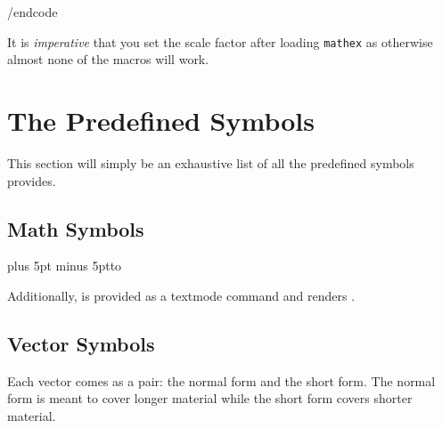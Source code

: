 \begincode

/endcode\par

It is {\it imperative} that you set the scale factor after loading {\tt mathex} as otherwise almost none of the macros will
work.

\section{The Predefined Symbols}

This section will simply be an exhaustive list of all the predefined symbols \MatheX{} provides.

\subsection{Math Symbols}

{\tabskip=10pt plus 5pt minus 5pt\jot\halign to }

Additionally, \macroname\lightning{} is provided as a textmode command and renders \lightning.

\subsection{Vector Symbols}

Each vector comes as a pair: the normal form and the short form.
The normal form is meant to cover longer material while the short form covers shorter material.

\bigskip
\showcasevecc{}
\showcasevecc{}
\showcasevecc{}
\vfill\break
\showcasevecc{}
\showcasevecc{}
\showcasevecc{}
\showcasevecc{}
\showcasevecc{}
\showcasevecc{}

